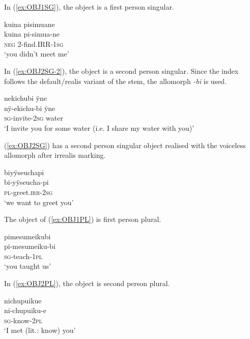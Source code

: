 In (\ref{ex:OBJ1SG}), the object is a first person singular. 

\ea\label{ex:OBJ1SG}
\begingl 
\glpreamble kuina pisimuane\\
\gla kuina pi-simua-ne\\ 
\glb \textsc{neg} 2-find.IRR-1\textsc{sg}\\ 
\glft ‘you didn’t meet me’\\ 
\endgl
\trailingcitation{[mrx-c120509l.046]}
\xe

In (\ref{ex:OBJ2SG-2}), the object is a second person singular. Since the index follows the default/realis variant of the stem, the allomorph \textit{-bi} is used.

\ea\label{ex:OBJ2SG-2}
\begingl
\glpreamble nekichubi ÿne\\
\gla nÿ-ekichu-bi ÿne\\
\textsc{sg}-invite-2\textsc{sg} water\\
\glft ‘I invite you for some water (i.e. I share my water with you)’
\endgl
\trailingcitation{[jmx-e090727s.163]}
\xe

(\ref{ex:OBJ2SG}) has a second person singular object realised with the voiceless allomorph after irrealis marking.

\ea\label{ex:OBJ2SG}
\begingl 
\glpreamble biyÿseuchapi\\
\gla bi-yÿseucha-pi\\ 
\textsc{pl}-greet.\textsc{irr}-2\textsc{sg}\\ 
\glft ‘we want to greet you’\\ 
\endgl
\trailingcitation{[rxx-e121128s-2.007]}
\xe

The object of (\ref{ex:OBJ1PL}) is first person plural.

\ea\label{ex:OBJ1PL}
\begingl 
\glpreamble pimesumeikubi\\
\gla pi-mesumeiku-bi\\ 
\textsc{sg}-teach-1\textsc{pl}\\ 
\glft ‘you taught us’\\ 
\endgl
\trailingcitation{[oxx-e120414ls-1a.157]}%
\xe

In (\ref{ex:OBJ2PL}), the object is second person plural. 

\ea\label{ex:OBJ2PL}
\begingl 
\glpreamble nichupuikue\\
\gla ni-chupuiku-e\\ 
\textsc{sg}-know-2\textsc{pl}\\ 
\glft ‘I met (lit.: know) you’\\ 
\endgl
\trailingcitation{[cux-c120410ls.011]}
\xe
{}


